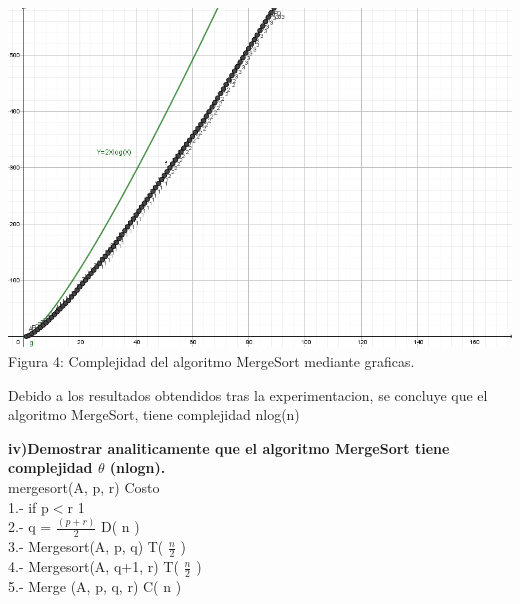 \documentclass[spanish]{article}
\begin{document}
	\begin{center}
	\includegraphics[scale=.5]{./imagenes/mergesort.png}\\
		Figura 4: Complejidad del algoritmo MergeSort mediante graficas.
	\end{center}
	Debido a los resultados obtendidos tras la experimentacion, se concluye que el algoritmo MergeSort, tiene complejidad nlog(n)


	\newpage
	{\large{\bf  iv)Demostrar analiticamente que el algoritmo MergeSort tiene complejidad $\theta$ (nlogn). }}\\		
	\noindent mergesort(A, p, r)  \hspace{4cm} Costo\\
	1.- if p$<$r \hspace{5.6cm} 1\\
    2.- q = $\frac{(p + r)}{2}$ \hspace{5cm} D( n )\\
    3.- Mergesort(A, p, q) \hspace{3.3cm} T( $\frac{n}{2}$ )\\
    4.- Mergesort(A, q+1, r) \hspace{2.8cm} T( $\frac{n}{2}$ )\\
    5.- Merge (A, p, q, r) \hspace{3.4cm} C( n )\\
    
\end{document}
